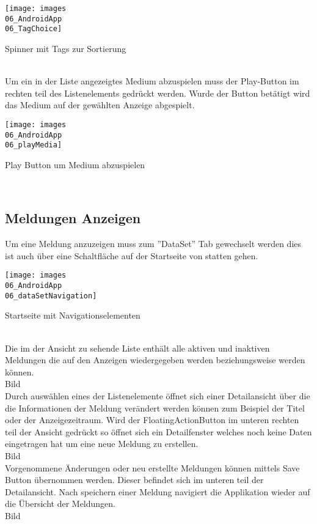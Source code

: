 \begin{tagSpinn}
\centering
\texttt{[image: images\\06\_AndroidApp\\06\_TagChoice]}
\caption{Spinner mit Tags zur Sortierung}
\label{fig:mediaNav}
\end{tagSpinn}
\\
Um ein in der Liste angezeigtes Medium abzuspielen muss der Play-Button im rechten teil des Listenelements gedrückt werden. Wurde der Button betätigt wird das Medium auf der gewählten Anzeige abgespielt.
\begin{playBut}
\centering
\texttt{[image: images\\06\_AndroidApp\\06\_playMedia]}
\caption{Play Button um Medium abzuspielen}
\label{fig:mediaNav}
\end{playBut}
\\
\subsection{Meldungen Anzeigen}
Um eine Meldung anzuzeigen muss zum ''DataSet'' Tab gewechselt werden dies ist auch über eine Schaltfläche auf der Startseite von statten gehen.
\begin{navDataSet}
\centering
\texttt{[image: images\\06\_AndroidApp\\06\_dataSetNavigation]}
\caption{Startseite mit Navigationselementen}
\label{fig:mediaNav}
\end{navDataSet}
\\
Die im der Ansicht zu sehende Liste enthält alle aktiven und  inaktiven Meldungen die auf den Anzeigen wiedergegeben werden beziehungsweise werden können. 
\\
Bild 
\\
Durch auswählen eines der Listenelemente öffnet sich einer Detailansicht über die die Informationen der Meldung verändert werden können zum Beispiel der Titel oder der Anzeigezeitraum. Wird der FloatingActionButton im unteren rechten teil der Ansicht gedrückt so öffnet sich ein Detailfenster welches noch keine Daten eingetragen hat um eine neue Meldung zu erstellen.
\\
Bild
\\
Vorgenommene Änderungen oder neu erstellte Meldungen können mittels Save Button übernommen werden. Dieser befindet sich im unteren teil der Detailansicht. Nach speichern einer Meldung navigiert die Applikation wieder auf die Übersicht der Meldungen.
\\
Bild
\\
